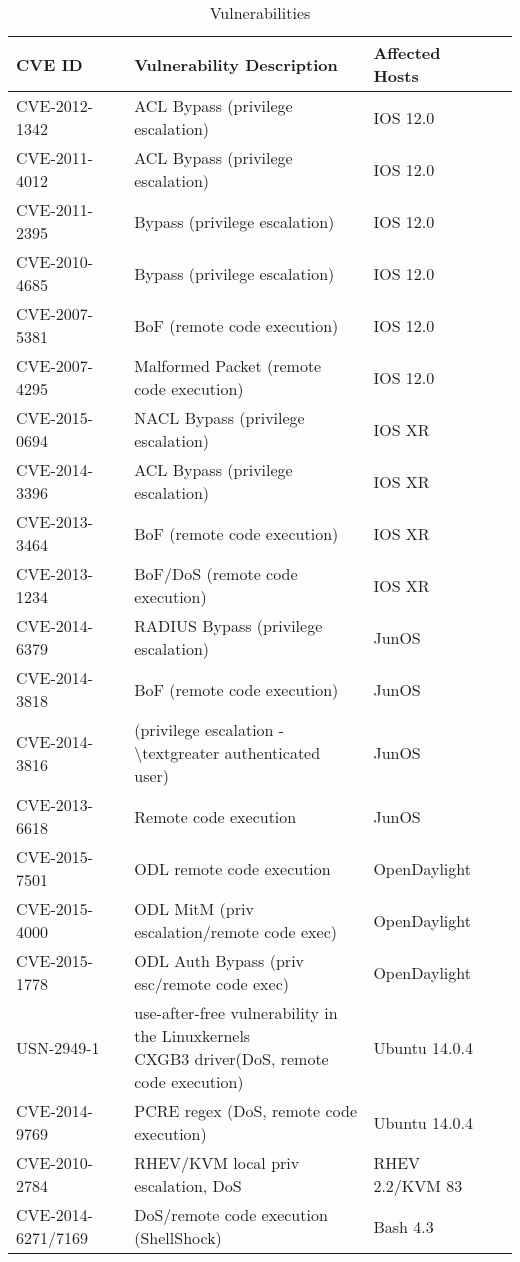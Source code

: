 \begin{table}[ht]
\caption{Vulnerabilities}
\begin{tabular}{@{}llll@{}}
\toprule
CVE ID & Vulnerability Description & Affected Hosts &  \\ \midrule
CVE-2012-1342 & ACL Bypass (privilege escalation) & IOS 12.0 &  \\
CVE-2011-4012 & ACL Bypass (privilege escalation) & IOS 12.0 &  \\
CVE-2011-2395 & Bypass (privilege escalation) & IOS 12.0 &  \\
CVE-2010-4685 & Bypass (privilege escalation) & IOS 12.0 &  \\
CVE-2007-5381 & BoF (remote code execution) & IOS 12.0 &  \\
CVE-2007-4295 & Malformed Packet (remote code execution) & IOS 12.0 &  \\
CVE-2015-0694 & NACL Bypass (privilege escalation) & IOS XR &  \\
CVE-2014-3396 & ACL Bypass (privilege escalation) & IOS XR &  \\
CVE-2013-3464 & BoF (remote code execution) & IOS XR &  \\
CVE-2013-1234 & BoF/DoS (remote code execution) & IOS XR &  \\
CVE-2014-6379 & RADIUS Bypass (privilege escalation) & JunOS &  \\
CVE-2014-3818 & BoF (remote code execution) & JunOS &  \\
CVE-2014-3816 & (privilege escalation -\textbackslash{}textgreater authenticated user) & JunOS &  \\
CVE-2013-6618 & Remote code execution & JunOS &  \\ 
\midrule
CVE-2015-7501 & ODL remote code execution & OpenDaylight &  \\
CVE-2015-4000 & ODL MitM (priv escalation/remote code exec) & OpenDaylight &  \\
CVE-2015-1778 & ODL Auth Bypass (priv esc/remote code exec) & OpenDaylight &  \\
USN-2949-1 & \makecell{use-after-free vulnerability in the Linuxkernels \\ CXGB3 driver(DoS, remote code execution)} & Ubuntu 14.0.4 &  \\
CVE-2014-9769 & PCRE regex (DoS, remote code execution) & Ubuntu 14.0.4 &  \\
CVE-2010-2784 & RHEV/KVM local priv escalation, DoS & RHEV 2.2/KVM 83 &  \\
CVE-2014-6271/7169 & DoS/remote code execution (ShellShock) & Bash 4.3 &  \\ 
\bottomrule
\end{tabular}%
\label{tab:case_study:att:vulns_01}
\end{table}

